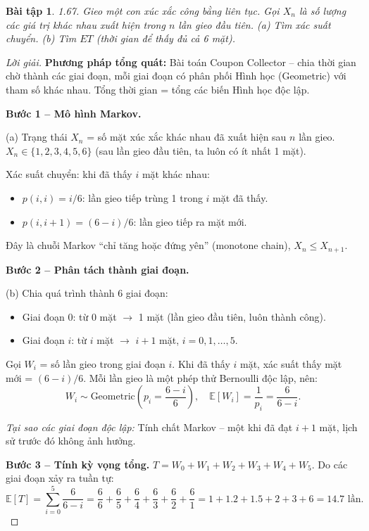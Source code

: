 \documentclass[8pt,a4paper]{article}
\newtheorem{exercise}{Bài tập}
\newenvironment{solution}{\begin{proof}[Lời giải]}{\end{proof}}
\newcommand{\E}{\mathbb{E}}
\begin{document}
\begin{exercise}
1.67. Gieo một con xúc xắc công bằng liên tục. Gọi $X_n$ là số lượng các giá trị khác nhau xuất hiện trong $n$ lần gieo đầu tiên.
(a) Tìm xác suất chuyển. (b) Tìm $ET$ (thời gian để thấy đủ cả 6 mặt).
\end{exercise}
\begin{solution}
\textbf{Phương pháp tổng quát:} Bài toán Coupon Collector -- chia thời gian chờ thành các giai đoạn, mỗi giai đoạn có phân phối Hình học (Geometric) với tham số khác nhau. Tổng thời gian = tổng các biến Hình học độc lập.

\textbf{Bước 1 -- Mô hình Markov.}

(a) Trạng thái $X_n$ = số mặt xúc xắc khác nhau đã xuất hiện sau $n$ lần gieo. $X_n \in \{1, 2, 3, 4, 5, 6\}$ (sau lần gieo đầu tiên, ta luôn có ít nhất 1 mặt).

Xác suất chuyển: khi đã thấy $i$ mặt khác nhau:
\begin{itemize}[nosep]
  \item $p(i, i) = i/6$: lần gieo tiếp trùng 1 trong $i$ mặt đã thấy.
  \item $p(i, i+1) = (6-i)/6$: lần gieo tiếp ra mặt mới.
\end{itemize}

Đây là chuỗi Markov ``chỉ tăng hoặc đứng yên'' (monotone chain), $X_n \leq X_{n+1}$.

\textbf{Bước 2 -- Phân tách thành giai đoạn.}

(b) Chia quá trình thành 6 giai đoạn:
\begin{itemize}[nosep]
  \item Giai đoạn 0: từ 0 mặt $\to$ 1 mặt (lần gieo đầu tiên, luôn thành công).
  \item Giai đoạn $i$: từ $i$ mặt $\to$ $i+1$ mặt, $i = 0, 1, \ldots, 5$.
\end{itemize}

Gọi $W_i$ = số lần gieo trong giai đoạn $i$. Khi đã thấy $i$ mặt, xác suất thấy mặt mới = $(6-i)/6$. Mỗi lần gieo là một phép thử Bernoulli độc lập, nên:
\[
  W_i \sim \text{Geometric}\left(p_i = \frac{6-i}{6}\right), \quad \E[W_i] = \frac{1}{p_i} = \frac{6}{6-i}.
\]

\textit{Tại sao các giai đoạn độc lập:} Tính chất Markov -- một khi đã đạt $i+1$ mặt, lịch sử trước đó không ảnh hưởng.

\textbf{Bước 3 -- Tính kỳ vọng tổng.}
$T = W_0 + W_1 + W_2 + W_3 + W_4 + W_5$. Do các giai đoạn xảy ra tuần tự:
\[
  \E[T] = \sum_{i=0}^{5} \frac{6}{6-i} = \frac{6}{6} + \frac{6}{5} + \frac{6}{4} + \frac{6}{3} + \frac{6}{2} + \frac{6}{1} = 1 + 1.2 + 1.5 + 2 + 3 + 6 = 14.7 \text{ lần}.
\]


\end{solution}
\end{document}
